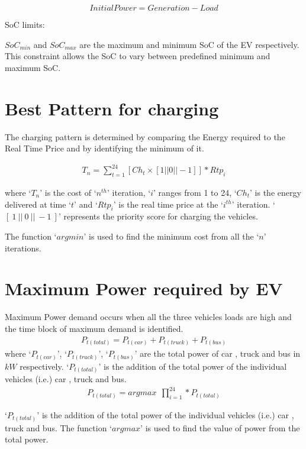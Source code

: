 \begin{equation}             
	 Initial Power = Generation - Load
\end{equation}

	  SoC limits:  
	 
	   $SoC_{min}$ and $SoC_{max}$ are  the maximum and minimum SoC of the EV respectively.
	   This constraint allows the SoC to vary between predefined minimum and maximum SoC.               
	
	\section{Best Pattern for charging}
	
	
	The charging pattern is determined by comparing the Energy required to the Real Time Price and by  identifying the minimum of it. 
	
	\begin{equation}
		\begin{split}
				T_{n} = \sum_{t=1}^{24} [Ch_{t} \times [1 || 0 || -1 ] ] \ast  Rtp_{i} 
		\end{split}
    \end{equation}	 

where `$T_{n}$' is the cost of `$n^{th}$' iteration, `$i$' ranges from 1 to 24, `$Ch_{t}$' is the energy delivered at time `$t$' and `$Rtp_{i}$' is the real time price at the `$i^{th}$' iteration.
`$[ \ 1 \ ||\ 0 \ ||\ -1\ ]$' represents the priority score for charging the vehicles.

The function `$argmin$'  is used to find the minimum cost from all the `$n$' iterations.	

	\section{Maximum Power required by EV}
	
	
	Maximum Power demand occurs when all the three vehicles loads are high and the time block of maximum demand is identified. 
	\begin{equation}
		\begin{split}
					P_{t(total)} = P_{t(car)} + P_{t(truck)} + P_{t(bus)}
		\end{split}
	\end{equation}	
where `$P_{t(car)}$', `$P_{t(truck)}$', `$P_{t(bus)}$' are the total power of car , truck and bus in $kW$ respectively. `$P_{t(total)}$' is the addition of the total  power of the individual vehicles (i.e.) car , truck and bus.
	\begin{equation}
		\begin{split}
				P_{t(total)} = argmax ~~\prod_{i=1}^{24} \ast P_{t(total)}
		\end{split}
	\end{equation}

`$P_{t(total)}$' is the addition of the total  power of the individual vehicles (i.e.) car , truck and bus. 
The function `$argmax$' is used to find the value of power from the total power. 
	
